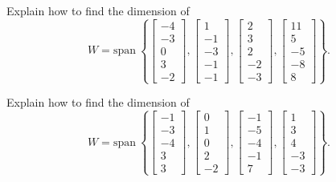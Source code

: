 \documentclass{article}
\begin{document}
\begin{exerciseStatement}
    Explain how to find the dimension of
\[W=\mathrm{span}\ \left\{\left[\begin{array}{r}
-4 \\
-3 \\
0 \\
3 \\
-2
\end{array}\right] , \left[\begin{array}{r}
1 \\
-1 \\
-3 \\
-1 \\
-1
\end{array}\right] , \left[\begin{array}{r}
2 \\
3 \\
2 \\
-2 \\
-3
\end{array}\right] , \left[\begin{array}{r}
11 \\
5 \\
-5 \\
-8 \\
8
\end{array}\right]\right\}.\]



  
\end{exerciseStatement}

\begin{exerciseStatement}
    Explain how to find the dimension of
\[W=\mathrm{span}\ \left\{\left[\begin{array}{r}
-1 \\
-3 \\
-4 \\
3 \\
3
\end{array}\right] , \left[\begin{array}{r}
0 \\
1 \\
0 \\
2 \\
-2
\end{array}\right] , \left[\begin{array}{r}
-1 \\
-5 \\
-4 \\
-1 \\
7
\end{array}\right] , \left[\begin{array}{r}
1 \\
3 \\
4 \\
-3 \\
-3
\end{array}\right]\right\}.\]



  
\end{exerciseStatement}
\end{document}
